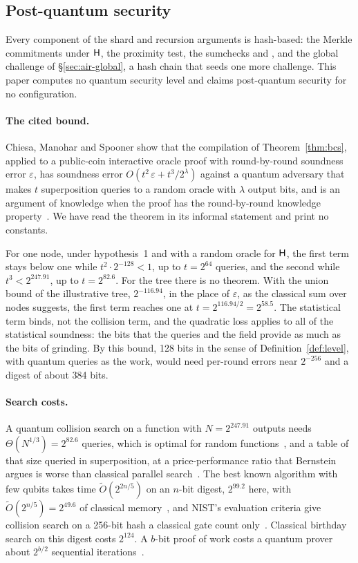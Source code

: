 \subsection{Post-quantum security}
\label{sec:pq}

Every component of the shard and recursion arguments is hash-based: the Merkle commitments under $\mathsf{H}$, the \WHIR{} proximity test, the sumchecks and \LogUp{}, and the global challenge of \S\ref{sec:air-global}, a hash chain that seeds one more \LogUp{} challenge. This paper computes no quantum security level and claims post-quantum security for no configuration.

\paragraph{The cited bound.} Chiesa, Manohar and Spooner show that the compilation of Theorem~\ref{thm:bcs}, applied to a public-coin interactive oracle proof with round-by-round soundness error $\varepsilon$, has soundness error $O(t^2\,\varepsilon + t^3/2^{\lambda})$ against a quantum adversary that makes $t$ superposition queries to a random oracle with $\lambda$ output bits, and is an argument of knowledge when the proof has the round-by-round knowledge property~\citep[Thm.~3]{cms19}. We have read the theorem in its informal statement and print no constants.

For one node, under hypothesis~1 and with a random oracle for $\mathsf{H}$, the first term stays below one while $t^2 \cdot 2^{-128} < 1$, up to $t = 2^{64}$ queries, and the second while $t^3 < 2^{247.91}$, up to $t = 2^{82.6}$. For the tree there is no theorem. With the union bound of the illustrative tree, $2^{-116.94}$, in the place of $\varepsilon$, as the classical sum over nodes suggests, the first term reaches one at $t = 2^{116.94/2} = 2^{58.5}$. The statistical term binds, not the collision term, and the quadratic loss applies to all of the statistical soundness: the bits that the queries and the field provide as much as the bits of grinding. By this bound, 128 bits in the sense of Definition~\ref{def:level}, with quantum queries as the work, would need per-round errors near $2^{-256}$ and a digest of about 384 bits.

\paragraph{Search costs.} A quantum collision search on a function with $N = 2^{247.91}$ outputs needs $\Theta(N^{1/3}) = 2^{82.6}$ queries, which is optimal for random functions~\citep{bht98,zhandry-collision}, and a table of that size queried in superposition, at a price-performance ratio that Bernstein argues is worse than classical parallel search~\citep{bernstein09}. The best known algorithm with few qubits takes time $\tilde O(2^{2n/5})$ on an $n$-bit digest, $2^{99.2}$ here, with $\tilde O(2^{n/5}) = 2^{49.6}$ of classical memory~\citep{cns17}, and NIST's evaluation criteria give collision search on a 256-bit hash a classical gate count only~\citep{nist-pqc-cfp}. Classical birthday search on this digest costs $2^{124}$. A $b$-bit proof of work costs a quantum prover about $2^{b/2}$ sequential iterations~\citep{grover96}.

